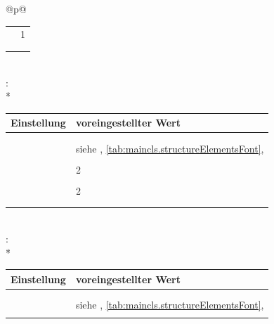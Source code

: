 \begin{longtable}{@{}p{\columnwidth}@{}}
\begin{tabularx}{\linewidth}{ll}
    \PValue{toclevel}    & 1 \\
    \PValue{tocnumwidth} & \PValue{2.3em}\\
    \PValue{tocstyle}    & \PValue{section} \\
    \bottomrule
    \end{tabularx} \\
    \addlinespace[\normalbaselineskip]
    : \\*
    \begin{tabularx}{\linewidth}{ll}
    \toprule
    Einstellung & voreingestellter Wert \\
    \midrule\nopagebreak
    \PValue{afterskip}   & \PValue{1.5ex plus .2ex} \\
    \PValue{beforeskip}  & \PValue{-3.25ex plus -1ex minus -.2ex} \\
    \PValue{font}        & siehe
                           \DescRef{maincls.fontelement.subsection},
                           \autoref{tab:maincls.structureElementsFont},
                           \autopageref{tab:maincls.structureElementsFont} \\
    \PValue{indent}      & \PValue{0pt} \\
    \PValue{level}       & 2 \\
    \PValue{tocindent}   & \PValue{3.8em}\\
    \PValue{toclevel}    & 2 \\
    \PValue{tocnumwidth} & \PValue{3.2em}\\
    \PValue{tocstyle}    & \PValue{section} \\
    \bottomrule
    \end{tabularx} \\
    \addlinespace[\normalbaselineskip]
    : \\*
    \begin{tabularx}{\linewidth}{ll}
    \toprule
    Einstellung & voreingestellter Wert \\
    \midrule\nopagebreak
    \PValue{afterskip}   & \PValue{1.5ex plus .2ex} \\
    \PValue{beforeskip}  & \PValue{-3.25ex plus -1ex minus -.2ex} \\
    \PValue{font}        & siehe
                           \DescRef{maincls.fontelement.subsubsection},
                           \autoref{tab:maincls.structureElementsFont},
                           \autopageref{tab:maincls.structureElementsFont} \\
    \PValue{indent}      & \PValue{0pt} \\

\end{tabularx}
\end{longtable}
